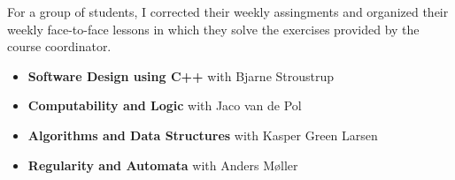 
For a group of students, I corrected their weekly assingments and organized their weekly
face-to-face lessons in which they solve the exercises provided by the course coordinator.

\medskip
\begin{itemize}
\item \textbf{Software Design using C++} with Bjarne Stroustrup
\item \textbf{Computability and Logic} with Jaco van de Pol
\item \textbf{Algorithms and Data Structures} with Kasper Green Larsen
\item \textbf{Regularity and Automata} with Anders M{\o}ller
\end{itemize}
